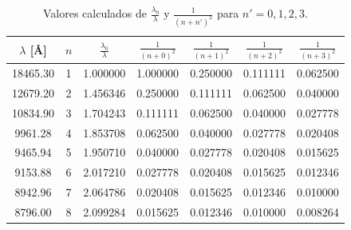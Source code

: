 \documentclass[11pt,a4paper]{article}
\begin{document}
\begin{table}[h!]
\centering
\caption{Valores calculados de $\frac{\lambda_0}{\lambda}$ y $\frac{1}{(n+n')^2}$ para $n' = 0, 1, 2, 3$.}
\label{tab:tablas_n_prima}
\small
\begin{tabular}{ccccccc}
\toprule
\textbf{$\lambda$ [\AA]} & \textbf{$n$} & \textbf{$\frac{\lambda_0}{\lambda}$} & \textbf{$\frac{1}{(n+0)^2}$} & \textbf{$\frac{1}{(n+1)^2}$} & \textbf{$\frac{1}{(n+2)^2}$} & \textbf{$\frac{1}{(n+3)^2}$} \\ \midrule
18465.30 & 1 & 1.000000 & 1.000000 & 0.250000 & 0.111111 & 0.062500 \\
12679.20 & 2 & 1.456346 & 0.250000 & 0.111111 & 0.062500 & 0.040000 \\
10834.90 & 3 & 1.704243 & 0.111111 & 0.062500 & 0.040000 & 0.027778 \\
9961.28  & 4 & 1.853708 & 0.062500 & 0.040000 & 0.027778 & 0.020408 \\
9465.94  & 5 & 1.950710 & 0.040000 & 0.027778 & 0.020408 & 0.015625 \\
9153.88  & 6 & 2.017210 & 0.027778 & 0.020408 & 0.015625 & 0.012346 \\
8942.96  & 7 & 2.064786 & 0.020408 & 0.015625 & 0.012346 & 0.010000 \\
8796.00  & 8 & 2.099284 & 0.015625 & 0.012346 & 0.010000 & 0.008264 \\ \bottomrule
\end{tabular}
\end{table}
\end{document}

